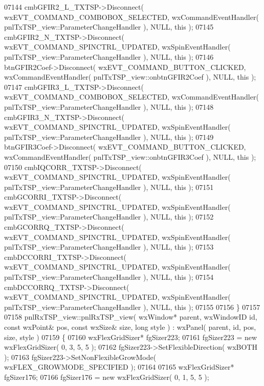 \begin{DoxyCode}
07144     cmbGFIR2_L_TXTSP->Disconnect( wxEVT\_COMMAND\_COMBOBOX\_SELECTED, wxCommandEventHandler( 
      pnlTxTSP_view::ParameterChangeHandler ), NULL, \textcolor{keyword}{this} );
07145     cmbGFIR2_N_TXTSP->Disconnect( wxEVT\_COMMAND\_SPINCTRL\_UPDATED, wxSpinEventHandler( 
      pnlTxTSP_view::ParameterChangeHandler ), NULL, \textcolor{keyword}{this} );
07146     btnGFIR2Coef->Disconnect( wxEVT\_COMMAND\_BUTTON\_CLICKED, wxCommandEventHandler( 
      pnlTxTSP_view::onbtnGFIR2Coef ), NULL, \textcolor{keyword}{this} );
07147     cmbGFIR3_L_TXTSP->Disconnect( wxEVT\_COMMAND\_COMBOBOX\_SELECTED, wxCommandEventHandler( 
      pnlTxTSP_view::ParameterChangeHandler ), NULL, \textcolor{keyword}{this} );
07148     cmbGFIR3_N_TXTSP->Disconnect( wxEVT\_COMMAND\_SPINCTRL\_UPDATED, wxSpinEventHandler( 
      pnlTxTSP_view::ParameterChangeHandler ), NULL, \textcolor{keyword}{this} );
07149     btnGFIR3Coef->Disconnect( wxEVT\_COMMAND\_BUTTON\_CLICKED, wxCommandEventHandler( 
      pnlTxTSP_view::onbtnGFIR3Coef ), NULL, \textcolor{keyword}{this} );
07150     cmbIQCORR_TXTSP->Disconnect( wxEVT\_COMMAND\_SPINCTRL\_UPDATED, wxSpinEventHandler( 
      pnlTxTSP_view::ParameterChangeHandler ), NULL, \textcolor{keyword}{this} );
07151     cmbGCORRI_TXTSP->Disconnect( wxEVT\_COMMAND\_SPINCTRL\_UPDATED, wxSpinEventHandler( 
      pnlTxTSP_view::ParameterChangeHandler ), NULL, \textcolor{keyword}{this} );
07152     cmbGCORRQ_TXTSP->Disconnect( wxEVT\_COMMAND\_SPINCTRL\_UPDATED, wxSpinEventHandler( 
      pnlTxTSP_view::ParameterChangeHandler ), NULL, \textcolor{keyword}{this} );
07153     cmbDCCORRI_TXTSP->Disconnect( wxEVT\_COMMAND\_SPINCTRL\_UPDATED, wxSpinEventHandler( 
      pnlTxTSP_view::ParameterChangeHandler ), NULL, \textcolor{keyword}{this} );
07154     cmbDCCORRQ_TXTSP->Disconnect( wxEVT\_COMMAND\_SPINCTRL\_UPDATED, wxSpinEventHandler( 
      pnlTxTSP_view::ParameterChangeHandler ), NULL, \textcolor{keyword}{this} );
07155     
07156 \}
07157 
07158 pnlRxTSP_view::pnlRxTSP_view( wxWindow* parent, wxWindowID \textcolor{keywordtype}{id}, \textcolor{keyword}{const} wxPoint& pos, \textcolor{keyword}{const} wxSize& 
      size, \textcolor{keywordtype}{long} style ) : wxPanel( parent, id, pos, size, style )
07159 \{
07160     wxFlexGridSizer* fgSizer223;
07161     fgSizer223 = \textcolor{keyword}{new} wxFlexGridSizer( 0, 3, 5, 5 );
07162     fgSizer223->SetFlexibleDirection( wxBOTH );
07163     fgSizer223->SetNonFlexibleGrowMode( wxFLEX\_GROWMODE\_SPECIFIED );
07164     
07165     wxFlexGridSizer* fgSizer176;
07166     fgSizer176 = \textcolor{keyword}{new} wxFlexGridSizer( 0, 1, 5, 5 );

\end{DoxyCode}
